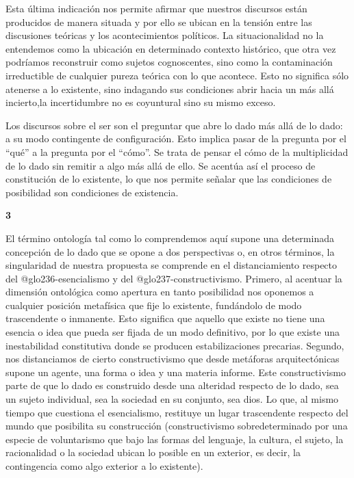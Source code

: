 Esta última indicación nos permite afirmar que nuestros discursos están producidos de manera situada y por ello se ubican en la tensión entre las discusiones teóricas y los acontecimientos políticos. La situacionalidad no la entendemos como la ubicación en determinado contexto histórico, que otra vez podríamos reconstruir como sujetos cognoscentes, sino como la contaminación irreductible de cualquier pureza teórica con lo que acontece. Esto no significa sólo atenerse a lo existente, sino indagando sus condiciones abrir hacia un más allá incierto,la incertidumbre no es coyuntural sino su mismo exceso.

Los discursos sobre el ser son el preguntar que abre lo dado más allá de lo dado: a su modo contingente de configuración. Esto implica pasar de la pregunta por el \enquote{qué} a la pregunta por el \enquote{cómo}. Se trata de pensar el cómo de la multiplicidad de lo dado sin remitir a algo más allá de ello. Se acentúa así el proceso de constitución de lo existente, lo que nos permite señalar que las condiciones de posibilidad son condiciones de existencia.

\vspace{1em}
\noindent\textbf{3}

El término ontología tal como lo comprendemos aquí supone una determinada concepción de lo dado que se opone a dos perspectivas o, en otros términos, la singularidad de nuestra propuesta se comprende en el distanciamiento respecto del \gls{@glo236-esencialismo} y del \gls{@glo237-constructivismo}. Primero, al acentuar la dimensión ontológica como apertura en tanto posibilidad nos oponemos a cualquier posición metafísica que fije lo existente, fundándolo de modo trascendente o inmanente. Esto significa que aquello que existe no tiene una esencia o idea que pueda ser fijada de un modo definitivo, por lo que existe una inestabilidad constitutiva donde se producen estabilizaciones precarias. Segundo, nos distanciamos de cierto constructivismo que desde metáforas arquitectónicas supone un agente, una forma o idea y una materia informe. Este constructivismo parte de que lo dado es construido desde una alteridad respecto de lo dado, sea un sujeto individual, sea la sociedad en su conjunto, sea dios. Lo que, al mismo tiempo que cuestiona el esencialismo, restituye un lugar trascendente respecto del mundo que posibilita su construcción (constructivismo sobredeterminado por una especie de voluntarismo que bajo las formas del lenguaje, la cultura, el sujeto, la racionalidad o la sociedad ubican lo posible en un exterior, es decir, la contingencia como algo exterior a lo existente).

